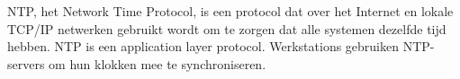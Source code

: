 NTP, het Network Time Protocol, is een protocol dat over het Internet en lokale TCP/IP netwerken gebruikt wordt om te zorgen dat alle systemen dezelfde tijd hebben. NTP is een application layer protocol. Werkstations gebruiken NTP-servers om hun klokken mee te synchroniseren.

